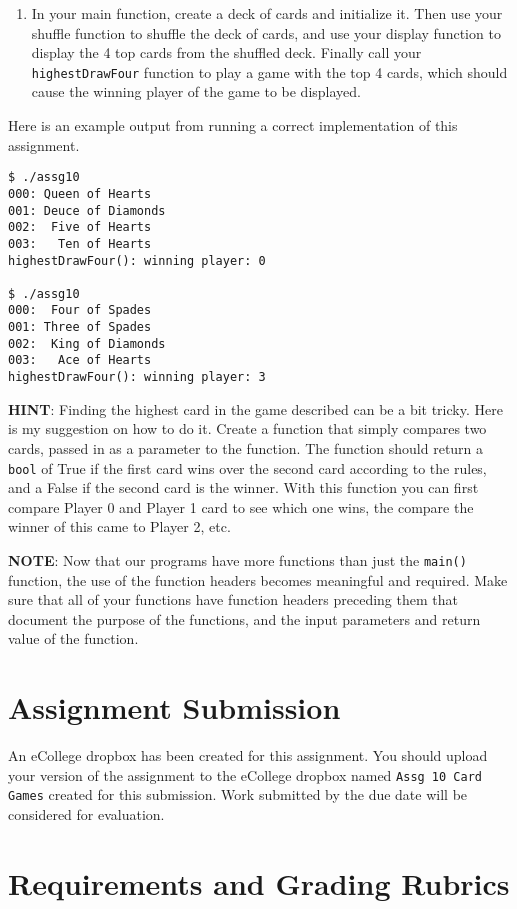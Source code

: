 \documentclass[11pt]{article}
\begin{document}
\begin{enumerate}
\item In your main function, create a deck of cards and initialize it.
Then use your shuffle function to shuffle the deck of cards, and
use your display function to display the 4 top cards from the
shuffled deck.  Finally call your \verb~highestDrawFour~ function
to play a game with the top 4 cards, which should cause
the winning player of the game to be displayed.
\end{enumerate}

Here is an example output from running a correct implementation of
this assignment.

\begin{verbatim}
$ ./assg10 
000: Queen of Hearts
001: Deuce of Diamonds
002:  Five of Hearts
003:   Ten of Hearts
highestDrawFour(): winning player: 0

$ ./assg10 
000:  Four of Spades
001: Three of Spades
002:  King of Diamonds
003:   Ace of Hearts
highestDrawFour(): winning player: 3
\end{verbatim}

\textbf{HINT}: Finding the highest card in the game described can be a bit
tricky.  Here is my suggestion on how to do it.  Create a function
that simply compares two cards, passed in as a parameter to the
function.  The function should return a \verb~bool~ of True if the first card
wins over the second card according to the rules, and a False if the
second card is the winner.  With this function you can first compare
Player 0 and Player 1 card to see which one wins, the compare the
winner of this came to Player 2, etc.

\textbf{NOTE}: Now that our programs have more functions than just the
\verb~main()~ function, the use of the function headers becomes meaningful
and required.  Make sure that all of your functions have function
headers preceding them that document the purpose of the functions, and
the input parameters and return value of the function.
\section*{Assignment Submission}
\label{sec-4}

An eCollege dropbox has been created for this assignment.  You should
upload your version of the assignment to the eCollege dropbox named
\verb~Assg 10 Card Games~ created for this submission.  Work
submitted by the due date will be considered for evaluation.
\section*{Requirements and Grading Rubrics}
\label{sec-5}
\end{document}
